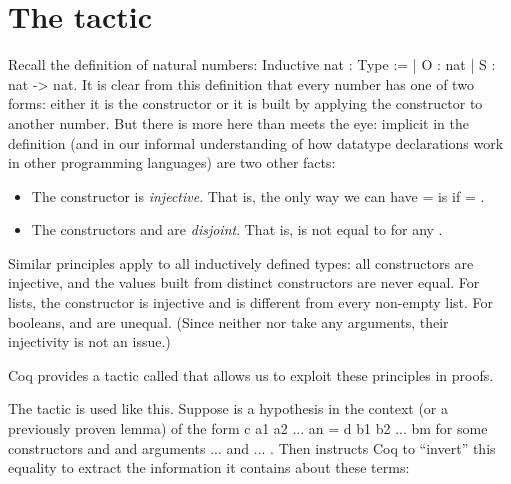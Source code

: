 \documentclass[12pt]{report}
\begin{document}
\section{The \texorpdfstring{\protect{}}{inversion} tactic}



 Recall the definition of natural numbers:
     Inductive nat : Type :=
       | O : nat
       | S : nat -> nat.
    It is clear from this definition that every number has one of two
    forms: either it is the constructor  or it is built by applying
    the constructor  to another number.  But there is more here than
    meets the eye: implicit in the definition (and in our informal
    understanding of how datatype declarations work in other
    programming languages) are two other facts:



\begin{itemize}
\item  The constructor  is \textit{injective}.  That is, the only way we can
      have   =   is if  = .



\item  The constructors  and  are \textit{disjoint}.  That is,  is not
      equal to   for any . 
\end{itemize}


 Similar principles apply to all inductively defined types: all
    constructors are injective, and the values built from distinct
    constructors are never equal.  For lists, the  constructor is
    injective and  is different from every non-empty list.  For
    booleans,  and  are unequal.  (Since neither 
    nor  take any arguments, their injectivity is not an issue.) 

 Coq provides a tactic called  that allows us to exploit
    these principles in proofs.


    The  tactic is used like this.  Suppose  is a
    hypothesis in the context (or a previously proven lemma) of the
    form
      c a1 a2 ... an = d b1 b2 ... bm
    for some constructors  and  and arguments  ...  and
     ... .  Then   instructs Coq to ``invert'' this
    equality to extract the information it contains about these terms:
\end{document}
